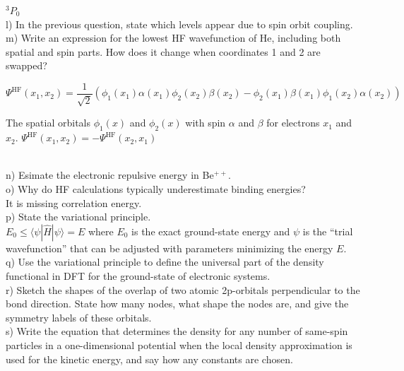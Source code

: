 \documentclass{article}
\begin{document}
{\color{blue} $^3P_0$}
\\

\noindent l) In the previous question, state which levels appear due to spin orbit
coupling.
\\

\noindent m) Write an expression for the lowest HF wavefunction of He, including both
spatial and spin parts. How does it change when coordinates 1 and 2 are swapped?
\\

{\color{blue}
  \begin{equation*}
    \Psi^{\text{HF}}(x_1,x_2) = \frac{1}{\sqrt{2}}(\phi_1(x_1)
    \alpha(x_1)\phi_2(x_2)\beta(x_2) - \phi_2(x_1)\beta(x_1)
    \phi_1(x_2)\alpha(x_2))
  \end{equation*}
  
  The spatial orbitals $\phi_1(x)$ and $\phi_2(x)$ with spin $\alpha$ and $\beta$
  for electrons $x_1$ and $x_2$. $\Psi^{\text{HF}}(x_1,x_2) = -\Psi^{\text{HF}}(x_2,x_1)$
}\\

\noindent n) Esimate the electronic repulsive energy in Be$^{++}$.
\\

\noindent o) Why do HF calculations typically underestimate binding energies?
\\

{\color{blue} It is missing correlation energy.}
\\

\noindent p) State the variational principle.
\\

{\color{blue} $E_0 \leq \langle\psi|\hat{H}|\psi\rangle = E$ where $E_0$ is the exact
  ground-state energy and $\psi$ is the ``trial wavefunction'' that can be adjusted with
  parameters minimizing the energy $E$.
}\\

\noindent q) Use the variational principle to define the universal part of the density
functional in DFT for the ground-state of electronic systems.
\\

\noindent r) Sketch the shapes of the overlap of two atomic 2p-orbitals perpendicular
to the bond direction. State how many nodes, what shape the nodes are, and give the
symmetry labels of these orbitals.
\\

\noindent s) Write the equation that determines the density for any number of same-spin
particles in a one-dimensional potential when the local density approximation is used
for the kinetic energy, and say how any constants are chosen.
\\
\end{document}
